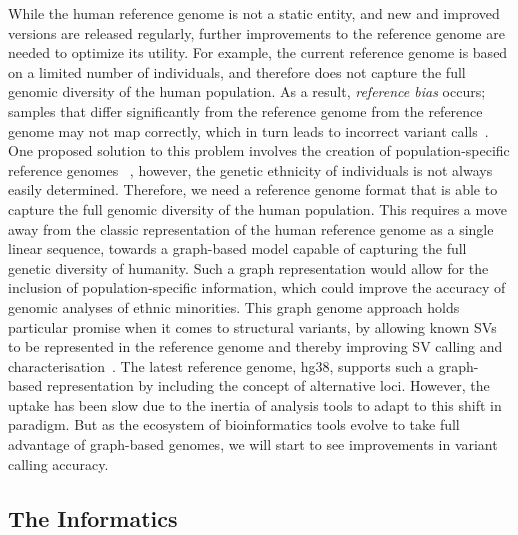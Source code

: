 While the human reference genome is not a static entity, and new and improved versions are released regularly, further improvements to the reference genome are needed to optimize its utility.
For example, the current reference genome is based on a limited number of individuals, and therefore does not capture the full genomic diversity of the human population.
As a result, \emph{reference bias} occurs; samples that differ significantly from the reference genome from the reference genome may not map correctly, which in turn leads to incorrect variant calls~\cite{ballouz2019time}.
One proposed solution to this problem involves the creation of population-specific reference genomes ~\cite{cho2016ethnically}, however, the genetic ethnicity of individuals is not always easily determined.
Therefore, we need a reference genome format that is able to capture the full genomic diversity of the human population. This requires a move away from the classic representation of the human reference genome as a single linear sequence, towards a graph-based model capable of capturing the full genetic diversity of humanity.
Such a graph representation would allow for the inclusion of population-specific information, which could improve the accuracy of genomic analyses of ethnic minorities.
This graph genome approach holds particular promise when it comes to structural variants, by allowing known SVs to be represented in the reference genome and thereby improving SV calling and characterisation~\cite{rakocevic2019fast}.
The latest reference genome, hg38, supports such a graph-based representation by including the concept of alternative loci.
However, the uptake has been slow due to the inertia of analysis tools to adapt to this shift in paradigm. But as the ecosystem of bioinformatics tools evolve to take full advantage of graph-based genomes, we will start to see improvements in variant calling accuracy.

\subsection{The Informatics}
